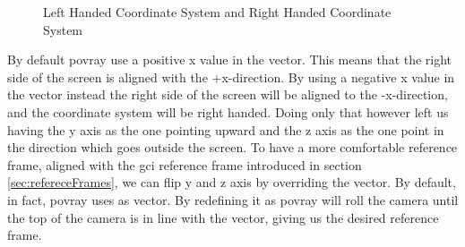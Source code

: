 \begin{figure}[htbp]
  \centering
  \qquad
  \caption{Left Handed Coordinate System and Right Handed Coordinate System}
  \label{fig:frames}
\end{figure}

By default \acrshort{povray} use a positive x value in the  vector. This means that the right side of the screen is aligned with the +x-direction. By using a negative x value in the  vector instead the right side of the screen will be aligned to the -x-direction, and the coordinate system will be right handed. Doing only that however left us having the y axis as the one pointing upward and the z axis as the one point in the direction which goes outside the screen.
To have a more comfortable reference frame, aligned with the \acrshort{gci} reference frame introduced in section \ref{sec:refereceFrames}, we can flip y and z axis by overriding the  vector. By default, in fact, \acrshort{povray} uses  as  vector. By redefining it as   \acrshort{povray} will roll the camera until the top of the camera is in line with the  vector, giving us the desired reference frame.

